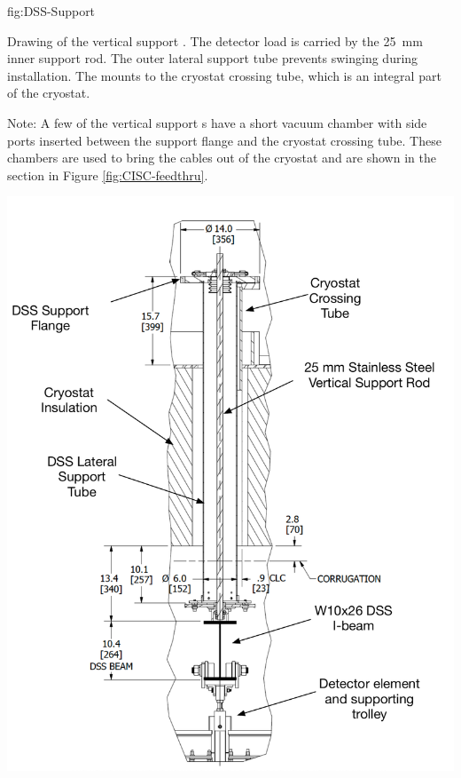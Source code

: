 \begin{dunefigure}{fig:DSS-Support}
  { Drawing of the  vertical support \fdth. The detector load is carried by the \SI{25}{mm} inner support rod. The outer lateral support tube prevents swinging during installation.  The \fdth mounts to the cryostat crossing tube, which is an integral part of the cryostat. 
  
  Note: A few of the  vertical support \fdth{}s have a short vacuum chamber with side ports inserted between the  support flange and the cryostat crossing tube. These chambers are used to bring the  cables out of the cryostat and are shown in the  section in Figure \ref{fig:CISC-feedthru}.}
\includegraphics[width=.85\textwidth]{graphics/DSS-Support.pdf}
\end{dunefigure}


